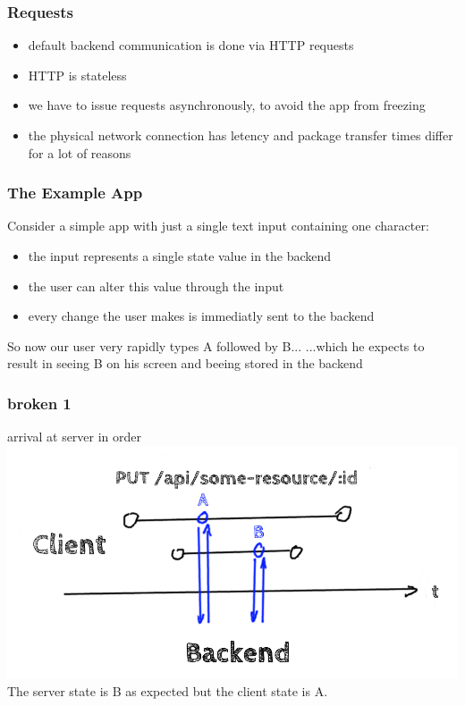 \documentclass{beamer}
\begin{document}
\begin{frame}
    \frametitle{Requests}
    \begin{itemize}
        \item default backend communication is done via HTTP requests
        \item HTTP is stateless
        \item we have to issue requests asynchronously, to avoid the app from
            freezing
        \item the physical network connection has letency and package transfer
            times differ for a lot of reasons
    \end{itemize}
\end{frame}

\begin{frame}
    \frametitle{The Example App}
    Consider a simple app with just a single text input containing one character:

    \begin{itemize}
        \item the input represents a single state value in the backend
        \item the user can alter this value through the input
        \item every change the user makes is immediatly sent to the backend
    \end{itemize}
\end{frame}

\begin{frame}
    \centering
    So now our user very rapidly types A followed by B...
    \newline
    \newline
    ...which he expects to result in seeing B on his screen and beeing stored in
    the backend
\end{frame}

\begin{frame}
    \frametitle{broken 1}

    \begin{block}{arrival at server in order}
        \includegraphics[scale=0.2]{right-result-wrong-sync}
        The server state is B as expected but the client state is A.
    \end{block}
\end{frame}
\end{document}
